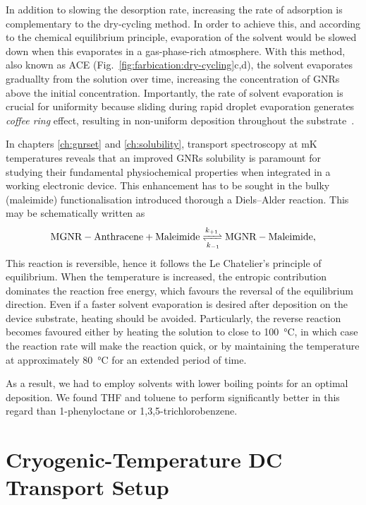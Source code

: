 In addition to slowing the desorption rate, increasing the rate of adsorption is complementary to the dry-cycling method. In order to achieve this, and according to the chemical equilibrium principle, evaporation of the solvent would be slowed down when this evaporates in a gas-phase-rich atmosphere. With this method, also known as \gls{ACE} (Fig.~\ref{fig:farbication:dry-cycling}c,d), the solvent evaporates graduallty from the solution over time, increasing the concentration of \glspl{GNR} above the initial concentration. Importantly, the rate of solvent evaporation is crucial for uniformity because sliding during rapid droplet evaporation generates \textit{coffee ring} effect, resulting in non-uniform deposition throughout the substrate~\cite{deegan1997capillary}.

In chapters \ref{ch:gnrset} and \ref{ch:solubility}, transport spectroscopy at \si{\milli\kelvin} temperatures reveals that an improved \glspl{GNR} solubility is paramount for studying their fundamental physiochemical properties when integrated in a working electronic device. This enhancement has to be sought in the bulky  (maleimide) functionalisation introduced thorough a Diels--Alder reaction. This may be schematically written as
%
\begin{equation}
    \label{eq:absorption}
    \textrm{MGNR}-\textrm{Anthracene} + \textrm{Maleimide} \xrightleftharpoons[k_{-1}]{k_{+1}} \textrm{MGNR}-\textrm{Maleimide},
\end{equation}
%
This reaction is reversible, hence it follows the Le Chatelier's principle of equilibrium. When the temperature is increased, the entropic contribution dominates the reaction free energy, which favours the reversal of the equilibrium direction. Even if a faster solvent evaporation is desired after deposition on the device substrate, heating should be avoided. Particularly, the reverse reaction becomes favoured either by heating the solution to close to \SI{100}{\degreeCelsius}, in which case the reaction rate will make the reaction quick, or by maintaining the temperature at approximately \SI{80}{\degreeCelsius} for an extended period of time.

As a result, we had to employ solvents with lower boiling points for an optimal deposition. We found THF and toluene to perform significantly better in this regard than 1-phenyloctane or 1,3,5-trichlorobenzene.

\section{Cryogenic-Temperature DC Transport Setup}\label{ch:fabrication:sec:triton_setup}

